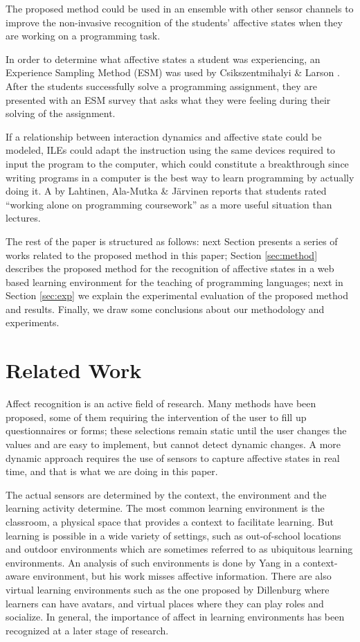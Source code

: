 \documentclass[a4paper,twoside]{article}
\begin{document}
The proposed method could be used in an ensemble with other sensor
channels to improve the non-invasive recognition of the students’ affective
states when they are working on a programming task.

In order to determine what
affective states a student was experiencing, an Experience Sampling Method (ESM)
was used by Csikszentmihalyi \& Larson \cite{kubey1996experience}. After the students successfully
solve a programming assignment, they are presented with an ESM survey that asks
what they were feeling during their solving of the assignment.

If a relationship between interaction dynamics and affective state could be modeled, ILEs could adapt the instruction using the
same devices required to input the program to the computer, which
could constitute a breakthrough since writing programs in a computer
is the best way to learn programming by actually doing it. A by Lahtinen, Ala-Mutka \& Järvinen
\cite{lahtinen2005study} reports that students rated ``working alone on programming coursework'' as a more useful situation than lectures.

The rest of the paper is structured as follows: next Section presents
a series of works related to the proposed method in this paper;
Section \ref{sec:method} describes the proposed method for the
recognition of affective states in a web based learning environment
for the teaching of programming languages; next in Section
\ref{sec:exp} we explain the experimental evaluation of the proposed
method and results.  Finally, we draw some conclusions about our
methodology and experiments.


\section{Related Work}

Affect recognition is an active field of research. Many
methods have been proposed, some of them requiring the intervention of
the user to fill up questionnaires or forms; these selections remain static until the user changes
the values and are easy to implement, but cannot detect dynamic
changes.  A more dynamic approach requires the use of sensors to capture
affective states in real time, and that is what we are doing in this
paper. 

The actual sensors are determined by the context, the environment and the learning
activity determine. The most common learning
environment is the classroom, a physical space that provides a context to facilitate
learning. But learning is possible in a wide variety of settings, such as
out-of-school locations and outdoor environments which are sometimes
referred to as ubiquitous learning environments. An analysis of such
environments is done by Yang \cite{yang2006context} in a context-aware
environment, but his work misses affective information. There are also
virtual learning environments such as the one proposed by Dillenburg 
\cite{dillenbourg2002virtual}  where learners can have avatars, and virtual places
where they can play roles and socialize. In general, the importance of
affect in learning environments has been recognized at a later stage
of research. 
\end{document}
